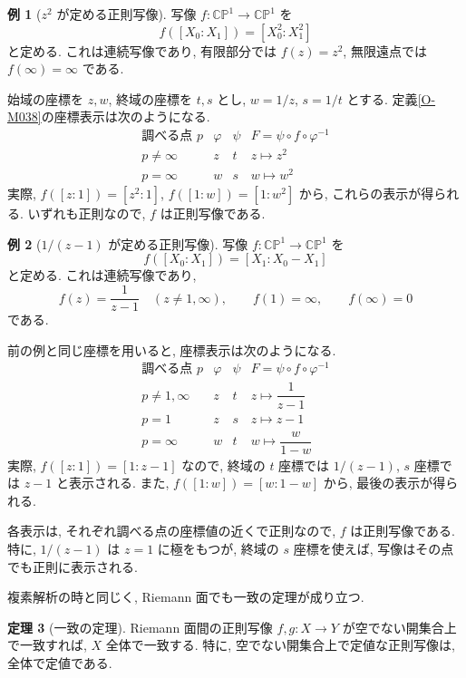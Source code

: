 \documentclass[dvipdfmx,a4paper,11pt]{article} %
\newcommand{\C}{\mathbb{C}}
\theoremstyle{definition}
\newtheorem{thm}{定理}[section]
\numberwithin{equation}{section}
\newtheorem{exa}[thm]{例}
\begin{document}
\begin{exa}[$z^2$ が定める正則写像]
写像 $f:\C\mathbb P^1\to\C\mathbb P^1$ を
\[
f([X_0:X_1])=[X_0^2:X_1^2]
\]
と定める.
これは連続写像であり, 有限部分では $f(z)=z^2$,
無限遠点では $f(\infty)=\infty$ である.

始域の座標を $z,w$, 終域の座標を $t,s$ とし,
$w=1/z$, $s=1/t$ とする.
定義\ref{O-M038}の座標表示は次のようになる.
\[
\begin{array}{c|c|c|c}
\text{調べる点 }p&\varphi&\psi&
F=\psi\circ f\circ\varphi^{-1}\\ \hline
p\neq\infty&z&t&z\longmapsto z^2\\[2pt]
p=\infty&w&s&w\longmapsto w^2
\end{array}
\]
実際, $f([z:1])=[z^2:1]$,
$f([1:w])=[1:w^2]$ から, これらの表示が得られる.
いずれも正則なので, $f$ は正則写像である.
\end{exa}

\begin{exa}[$1/(z-1)$ が定める正則写像]
写像 $f:\C\mathbb P^1\to\C\mathbb P^1$ を
\[
f([X_0:X_1])=[X_1:X_0-X_1]
\]
と定める.
これは連続写像であり,
\[
f(z)=\frac1{z-1}\quad(z\neq1,\infty),
\qquad f(1)=\infty,\qquad f(\infty)=0
\]
である.

前の例と同じ座標を用いると, 座標表示は次のようになる.
\[
\begin{array}{c|c|c|c}
\text{調べる点 }p&\varphi&\psi&
F=\psi\circ f\circ\varphi^{-1}\\ \hline
p\neq1,\infty&z&t&z\longmapsto\dfrac1{z-1}\\[6pt]
p=1&z&s&z\longmapsto z-1\\[2pt]
p=\infty&w&t&w\longmapsto\dfrac{w}{1-w}
\end{array}
\]
実際, $f([z:1])=[1:z-1]$ なので,
終域の $t$ 座標では $1/(z-1)$,
$s$ 座標では $z-1$ と表示される.
また, $f([1:w])=[w:1-w]$ から,
最後の表示が得られる.

各表示は, それぞれ調べる点の座標値の近くで正則なので,
$f$ は正則写像である.
特に, $1/(z-1)$ は $z=1$ に極をもつが,
終域の $s$ 座標を使えば, 写像はその点でも正則に表示される.
\end{exa}

複素解析の時と同じく, Riemann 面でも一致の定理が成り立つ. 
\begin{thm}[一致の定理]\label{O-M053}
Riemann 面間の正則写像 $f,g:X\to Y$ が空でない開集合上で一致すれば, 
$X$ 全体で一致する.
特に, 空でない開集合上で定値な正則写像は, 全体で定値である.
\end{thm}
\end{document}

